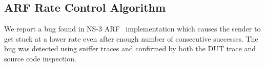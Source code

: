 \subsection{ARF Rate Control Algorithm}
\label{subsec:arf}

We report a bug found in NS-3 ARF~\cite{kamerman1997wavelan} implementation
which causes the sender to get stuck at a lower rate even after enough number of
consecutive successes. The bug was detected using sniffer traces and
confirmed by both the DUT trace and source code inspection.
